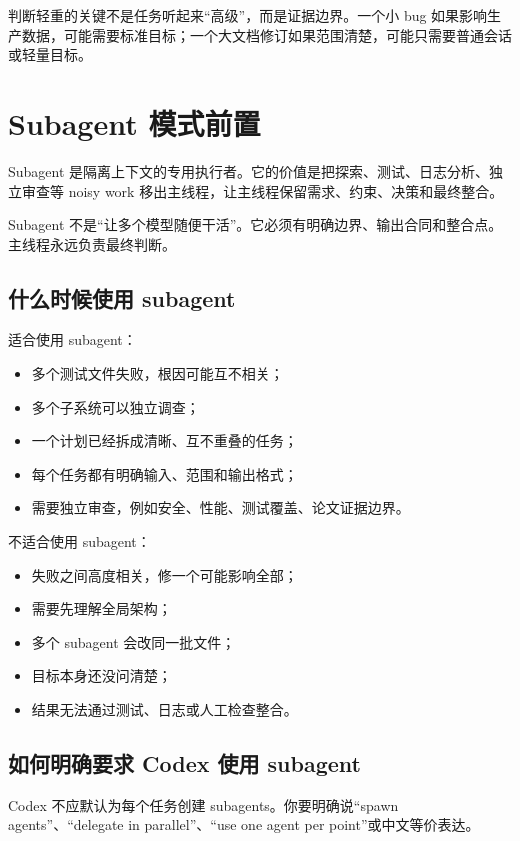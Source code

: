 \documentclass[UTF8,a4paper,11pt,fontset=none]{ctexart}
\begin{document}
判断轻重的关键不是任务听起来“高级”，而是证据边界。一个小 bug 如果影响生产数据，可能需要标准目标；一个大文档修订如果范围清楚，可能只需要普通会话或轻量目标。

\section{Subagent 模式前置}

Subagent 是隔离上下文的专用执行者。它的价值是把探索、测试、日志分析、独立审查等 noisy work 移出主线程，让主线程保留需求、约束、决策和最终整合。

Subagent 不是“让多个模型随便干活”。它必须有明确边界、输出合同和整合点。主线程永远负责最终判断。

\subsection{什么时候使用 subagent}

适合使用 subagent：

\begin{itemize}
  \item 多个测试文件失败，根因可能互不相关；
  \item 多个子系统可以独立调查；
  \item 一个计划已经拆成清晰、互不重叠的任务；
  \item 每个任务都有明确输入、范围和输出格式；
  \item 需要独立审查，例如安全、性能、测试覆盖、论文证据边界。
\end{itemize}

不适合使用 subagent：

\begin{itemize}
  \item 失败之间高度相关，修一个可能影响全部；
  \item 需要先理解全局架构；
  \item 多个 subagent 会改同一批文件；
  \item 目标本身还没问清楚；
  \item 结果无法通过测试、日志或人工检查整合。
\end{itemize}

\subsection{如何明确要求 Codex 使用 subagent}

Codex 不应默认为每个任务创建 subagents。你要明确说“spawn agents”、“delegate in parallel”、“use one agent per point”或中文等价表达。
\end{document}
